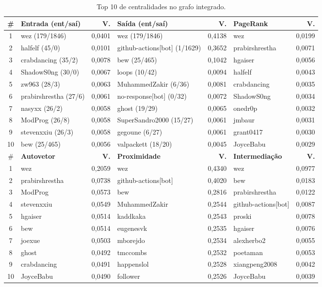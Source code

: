 \documentclass[12pt]{article}
\begin{document}
\begin{table}[ht]
\centering
\caption{Top 10 de centralidades no grafo integrado.}
\label{tab:centralidades-resultados}
\tiny
\renewcommand{\arraystretch}{0.82}
\setlength{\tabcolsep}{2pt}
\begin{tabularx}{\textwidth}{cXrXrXr}
\toprule
\# & \textbf{Entrada (ent/saí)} & \textbf{V.} & \textbf{Saída (ent/saí)} & \textbf{V.} & \textbf{PageRank} & \textbf{V.} \\
\midrule
1 & wez (179/1846) & 0,0401 & wez (179/1846) & 0,4138 & wez & 0,0199 \\
2 & halfelf (45/0) & 0,0101 & github-actions[bot] (1/1629) & 0,3652 & prabirshrestha & 0,0071 \\
3 & crabdancing (35/2) & 0,0078 & bew (25/465) & 0,1042 & hgaiser & 0,0056 \\
4 & ShadowS0ng (30/0) & 0,0067 & loops (10/42) & 0,0094 & halfelf & 0,0043 \\
5 & zw963 (28/3) & 0,0063 & MuhammedZakir (6/36) & 0,0081 & crabdancing & 0,0035 \\
6 & prabirshrestha (27/6) & 0,0061 & no-response[bot] (0/32) & 0,0072 & ShadowS0ng & 0,0034 \\
7 & nasyxx (26/2) & 0,0058 & ghost (19/29) & 0,0065 & onedr0p & 0,0032 \\
8 & ModProg (26/8) & 0,0058 & SuperSandro2000 (15/27) & 0,0061 & jmbaur & 0,0031 \\
9 & stevenxxiu (26/3) & 0,0058 & gegoune (6/27) & 0,0061 & grant0417 & 0,0030 \\
10 & bew (25/465) & 0,0056 & valpackett (18/20) & 0,0045 & JoyceBabu & 0,0029 \\
\midrule
\# & \textbf{Autovetor} & \textbf{V.} & \textbf{Proximidade} & \textbf{V.} & \textbf{Intermediação} & \textbf{V.} \\
\midrule
1 & wez & 0,2059 & wez & 0,4340 & wez & 0,0977 \\
2 & prabirshrestha & 0,0738 & github-actions[bot] & 0,4020 & bew & 0,0183 \\
3 & ModProg & 0,0573 & bew & 0,2816 & prabirshrestha & 0,0122 \\
4 & stevenxxiu & 0,0549 & MuhammedZakir & 0,2544 & github-actions[bot] & 0,0087 \\
5 & hgaiser & 0,0514 & kaddkaka & 0,2543 & proski & 0,0078 \\
6 & bew & 0,0514 & eugenesvk & 0,2535 & hgaiser & 0,0076 \\
7 & joexue & 0,0503 & mborejdo & 0,2534 & alexherbo2 & 0,0055 \\
8 & ghost & 0,0492 & tmccombs & 0,2532 & poetaman & 0,0053 \\
9 & crabdancing & 0,0491 & happenslol & 0,2528 & xiangpeng2008 & 0,0042 \\
10 & JoyceBabu & 0,0490 & follower & 0,2526 & JoyceBabu & 0,0039 \\
\bottomrule
\end{tabularx}
\end{table}
\end{document}
